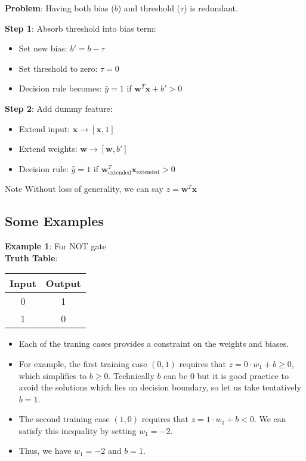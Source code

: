 \textbf{Problem}: Having both bias ($b$) and threshold ($\tau$) is redundant.

\textbf{Step 1}: Absorb threshold into bias term:
\begin{itemize}
    \item Set new bias: $b' = b - \tau$
    \item Set threshold to zero: $\tau = 0$
    \item Decision rule becomes: $\hat{y} = 1$ if $\bm{w}^T\bm{x} + b' > 0$
\end{itemize}

\textbf{Step 2}: Add dummy feature:
\begin{itemize}
    \item Extend input: $\bm{x} \rightarrow [\bm{x}, 1]$
    \item Extend weights: $\bm{w} \rightarrow [\bm{w}, b']$
    \item Decision rule: $\hat{y} = 1$ if $\bm{w}_{\text{extended}}^T \bm{x}_{\text{extended}} > 0$
\end{itemize}
\begin{block}{Note}
Without loss of generality, we can say $z = \bm{w}^{T}\bm{x}$
\end{block}

\subsection{Some Examples}

\textbf{Example 1}: For NOT gate \\

\textbf{Truth Table}: \\

\begin{tabular}{|c|c|}
\hline
Input & Output \\
\hline
0 & 1 \\
\hline
1 & 0 \\
\hline
\end{tabular}

\begin{itemize}
    \item Each of the traning cases provides a constraint on the weights and biases. 
    \item For example, the first training case $(0,1)$ requires that $z = 0 \cdot w_1 + b \geq 0$, which simplifies to $b \geq 0$. Technically $b$ can be $0$ but it is good practice to avoid the solutions which lies on decision boundary, so let us take tentatively $b=1$.
    \item The second training case $(1,0)$ requires that $z = 1 \cdot w_1  + b < 0$. We can satisfy this inequality by setting $w_1 = -2$.
    \item Thus, we have $w_1 = -2$ and $b = 1$.
\end{itemize}


